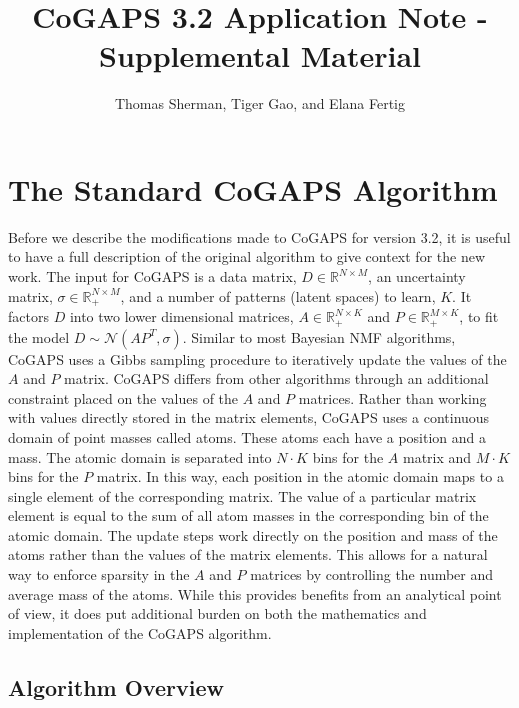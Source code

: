 \documentclass[]{article}
\title{CoGAPS 3.2 Application Note - Supplemental Material}
\author{Thomas Sherman, Tiger Gao, and Elana Fertig}
\begin{document}
\maketitle

\section{The Standard CoGAPS Algorithm}

Before we describe the modifications made to CoGAPS for version 3.2, it is useful to have a full description of the original algorithm to give context for the new work. The input for CoGAPS is a data matrix, $D\in\mathbb{R}^{N \times M}$, an uncertainty matrix, $\sigma\in\mathbb{R}_+^{N \times M}$, and a number of patterns (latent spaces) to learn, $K$. It factors $D$ into two lower dimensional matrices, $A\in\mathbb{R}_+^{N \times K}$ and $P\in\mathbb{R}_+^{M \times K}$, to fit the model $D \sim \mathcal{N}(AP^T, \sigma)$. Similar to most Bayesian NMF algorithms, CoGAPS uses a Gibbs sampling procedure to iteratively update the values of the $A$ and $P$ matrix. CoGAPS differs from other algorithms through an additional constraint placed on the values of the $A$ and $P$ matrices. Rather than working with values directly stored in the matrix elements, CoGAPS uses a continuous domain of point masses called atoms. These atoms each have a position and a mass. The atomic domain is separated into $N\cdot K$ bins for the $A$ matrix and $M\cdot K$ bins for the $P$ matrix. In this way, each position in the atomic domain maps to a single element of the corresponding matrix. The value of a particular matrix element is equal to the sum of all atom masses in the corresponding bin of the atomic domain. The update steps work directly on the position and mass of the atoms rather than the values of the matrix elements. This allows for a natural way to enforce sparsity in the $A$ and $P$ matrices by controlling the number and average mass of the atoms. While this provides benefits from an analytical point of view, it does put additional burden on both the mathematics and implementation of the CoGAPS algorithm.

\subsection{Algorithm Overview}
\end{document}
